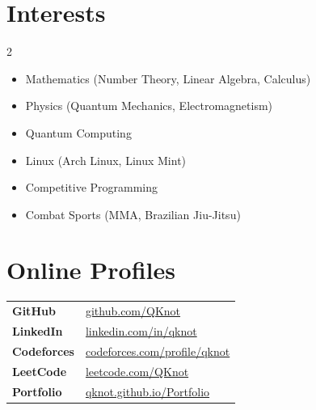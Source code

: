 \documentclass[a4paper,11pt]{article}
\begin{document}
\section{Interests}

\begin{multicols}{2}
\begin{itemize}[nosep, leftmargin=1.2em]
  \item Mathematics (Number Theory, Linear Algebra, Calculus)
  \item Physics (Quantum Mechanics, Electromagnetism)
  \item Quantum Computing
  \item Linux (Arch Linux, Linux Mint)
  \item Competitive Programming
  \item Combat Sports (MMA, Brazilian Jiu-Jitsu)
\end{itemize}
\end{multicols}

\section{Online Profiles}

\begin{tabularx}{\textwidth}{@{} l X @{}}
  \textbf{GitHub}       & \href{https://github.com/QKnot}{github.com/QKnot} \\[2pt]
  \textbf{LinkedIn}     & \href{https://www.linkedin.com/in/qknot}{linkedin.com/in/qknot} \\[2pt]
  \textbf{Codeforces}   & \href{https://codeforces.com/profile/qknot}{codeforces.com/profile/qknot} \\[2pt]
  \textbf{LeetCode}     & \href{https://leetcode.com/QKnot}{leetcode.com/QKnot} \\[2pt]
  \textbf{Portfolio}    & \href{https://qknot.github.io/Portfolio/}{qknot.github.io/Portfolio} \\
\end{tabularx}
\end{document}
